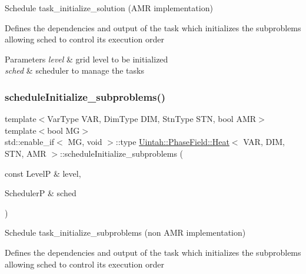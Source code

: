 Schedule task\+\_\+initialize\+\_\+solution (A\+MR implementation) 

Defines the dependencies and output of the task which initializes the subproblems allowing sched to control its execution order


\begin{DoxyParams}{Parameters}
{\em level} & grid level to be initialized \\
\hline
{\em sched} & scheduler to manage the tasks \\
\hline
\end{DoxyParams}
\mbox{\label{classUintah_1_1PhaseField_1_1Heat_a0e727154c6a78ee48cec37740cfe2889}} 
\subsubsection{\texorpdfstring{schedule\+Initialize\+\_\+subproblems()}{scheduleInitialize\_subproblems()}\hspace{0.1cm}{\footnotesize\ttfamily [1/2]}}
{\footnotesize\ttfamily template$<$Var\+Type V\+AR, Dim\+Type D\+IM, Stn\+Type S\+TN, bool A\+MR$>$ \\
template$<$bool MG$>$ \\
std\+::enable\+\_\+if$<$ MG, void $>$\+::type \hyperlink{classUintah_1_1PhaseField_1_1Heat}{Uintah\+::\+Phase\+Field\+::\+Heat}$<$ V\+AR, D\+IM, S\+TN, A\+MR $>$\+::schedule\+Initialize\+\_\+subproblems (\begin{DoxyParamCaption}\item[{const LevelP \&}]{level,  }\item[{SchedulerP \&}]{sched }\end{DoxyParamCaption})\hspace{0.3cm}{\ttfamily [protected]}}



Schedule task\+\_\+initialize\+\_\+subproblems (non A\+MR implementation) 

Defines the dependencies and output of the task which initializes the subproblems allowing sched to control its execution order


